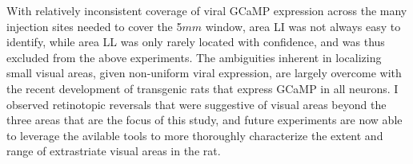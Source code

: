 
With relatively inconsistent coverage of viral GCaMP expression across the many injection sites needed to cover the 5$mm$ window, area LI was not always easy to identify, while area LL was only rarely located with confidence, and was thus excluded from the above experiments. The ambiguities inherent in localizing small visual areas, given non-uniform viral expression, are largely overcome with the recent development of transgenic rats that express GCaMP in all neurons\cite{Scott2018}. I observed retinotopic reversals that were suggestive of visual areas beyond the three areas that are the focus of this study, and future experiments are now able to leverage the avilable tools to more thoroughly characterize the extent and range of extrastriate visual areas in the rat. 


